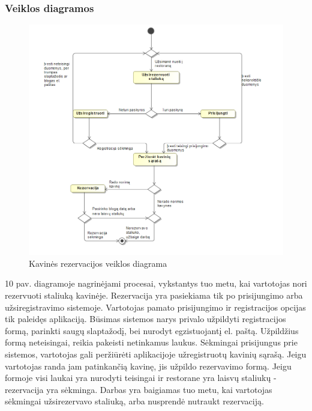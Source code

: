 \documentclass{VUMIFPSkursinis}
\begin{document}
\subsubsection{Veiklos diagramos}
\begin{figure}[H]
    \centering
    \includegraphics[width=\textwidth,height=\textheight,keepaspectratio]{img/rezerv} 
    \caption{Kavinės rezervacijos veiklos diagrama}
    \label{img:rezerv}
\end{figure}
10 pav.   diagramoje nagrinėjami procesai, vykstantys tuo metu, kai vartotojas nori rezervuoti staliuką kavinėje. Rezervacija yra pasiekiama tik po prisijungimo arba užsiregistravimo sistemoje. Vartotojas pamato prisijungimo ir registracijos opcijas tik paleidęs aplikaciją. Būsimas sistemos narys privalo užpildyti registracijos formą, parinkti saugų slaptažodį, bei nurodyt egzistuojantį el. paštą. Užpildžius formą neteisingai, reikia pakeisti netinkamus laukus. Sėkmingai prisijungus prie sistemos, vartotojas gali peržiūrėti aplikacijoje užregistruotų kavinių sąrašą. Jeigu vartotojas randa jam patinkančią kavinę, jis užpildo rezervavimo formą. Jeigu formoje visi laukai yra nurodyti teisingai ir restorane yra laisvų staliukų - rezervacija yra sėkminga. Darbas yra baigiamas tuo metu, kai vartotojas sėkmingai užsirezervavo staliuką, arba nusprendė nutraukt rezervaciją.
\end{document}
